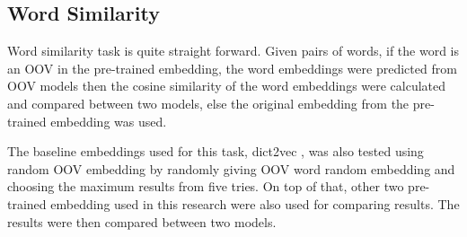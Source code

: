     \subsection{Word Similarity}
        Word similarity task is quite straight forward. Given pairs of
        words, if the word is an OOV in the pre-trained embedding, the
        word embeddings were predicted from OOV models then the cosine
        similarity of the word embeddings were calculated and compared
        between two models, else the original embedding from the
        pre-trained embedding was used. 
        
        The baseline embeddings used for this task, dict2vec
        \citep{dict2vect2017tissier}, was also tested using random OOV
        embedding by randomly giving OOV word random embedding and
        choosing the maximum results from five tries. On top of that,
        other two pre-trained embedding used in this research were
        also used for comparing results. The results were then
        compared between two models.